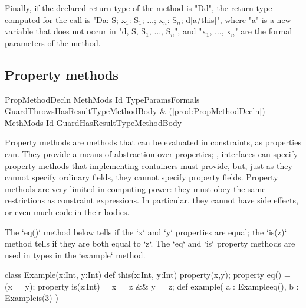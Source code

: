     Finally, if the declared return type of the method is
    \xcd"D{d}", the
    return type computed for the call is
    \xcdmath"D{a: S; x$_1$: S$_1$; $\dots$; x$_n$: S$_n$; d[a/this]}",
    where \xcd"a" is a new
    variable that does not occur in
    \xcdmath"d, S, S$_1$, $\dots$, S$_n$", and
    \xcdmath"x$_1$, $\dots$, x$_n$" are the formal
    parameters of the method.




\subsection{Property methods}

\begin{bbgrammar}
     PropMethodDecln \: MethMods Id TypeParams\opt Formals Guard\opt Throws\opt HasResultType\opt MethodBody & (\ref{prod:PropMethodDecln}) \\
                     \| MethMods Id Guard\opt HasResultType\opt MethodBody \\
\end{bbgrammar}

Property methods are methods that can be evaluated in constraints, as
properties can.   They provide a means of abstraction over properties; \eg,
interfaces can specify property methods that implementing containers must
provide, but, just as they cannot specify ordinary fields, they cannot specify
property fields.   Property methods are very limited in computing power: they
must obey the same restrictions as constraint expressions.  In particular,
they cannot have side effects, or even much code in their bodies.


\begin{ex}
The \xcd`eq()` method below tells if the \xcd`x` and \xcd`y`
properties are equal; the \xcd`is(z)` method tells if they are both equal to
\xcd`z`.  
The \xcd`eq` and \xcd`is` property methods are used in types in the
\xcd`example` method.
\begin{xten}
class Example(x:Int, y:Int) {
   def this(x:Int, y:Int) { property(x,y); }
   property eq() = (x==y);
   property is(z:Int) = x==z && y==z;
   def example( a : Example{eq()}, b : Example{is(3)} ) {}
}
\end{xten}
%
\end{ex}

